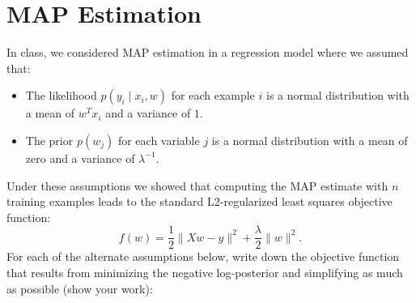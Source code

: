 \documentclass{article}
\def\blu#1{{\color{blu}#1}}
\def\norm#1{\|#1\|}
\def\cond{\; | \;}
\def\items#1{\begin{itemize}#1\end{itemize}}
\begin{document}
\section{MAP Estimation}

In class, we considered MAP estimation in a regression model where we assumed that:
\items{
\item The likelihood $p(y_i \cond x_i, w)$ for each example $i$ is a normal distribution with a mean of $w^Tx_i$ and a variance of $1$.
\item The prior $p(w_j)$ for each variable $j$ is a normal distribution with a mean of zero and a variance of $\lambda^{-1}$.
}
Under these assumptions we showed that computing the MAP estimate with $n$ training examples leads to the standard L2-regularized least squares objective function:
\[
f(w) = \frac{1}{2}\norm{Xw - y}^2 + \frac \lambda 2 \norm{w}^2.
\]
\blu{For each of the alternate assumptions below, write down the objective function that results from minimizing the negative log-posterior and simplifying as much as possible (show your work)}:
\end{document}
